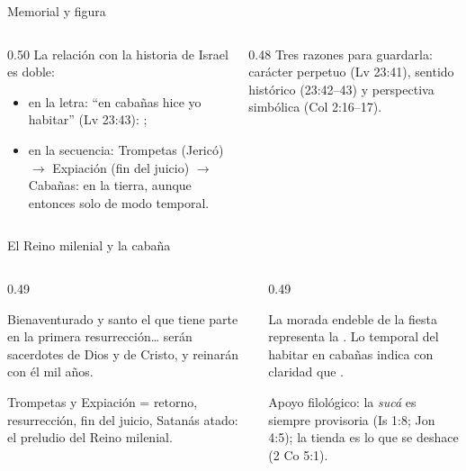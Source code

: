 \begin{frame}{Memorial y figura}
\begin{columns}[t,onlytextwidth]
\begin{column}{0.50\textwidth}\small
La relación con la historia de Israel es doble:
\begin{itemize}
\item en la letra: ``en cabañas hice yo habitar'' (Lv 23:43): ;
\item en la secuencia: Trompetas (Jericó) $\rightarrow$ Expiación (fin del juicio) $\rightarrow$ Cabañas:  en la tierra, aunque entonces solo de modo temporal.
\end{itemize}
\end{column}
\begin{column}{0.48\textwidth}\scriptsize
Tres razones para guardarla: carácter perpetuo (Lv 23:41), sentido histórico (23:42--43) y perspectiva simbólica (Col 2:16--17).\par\medskip
{}
\end{column}
\end{columns}
\end{frame}

\begin{frame}{El Reino milenial y la cabaña}
\begin{columns}[t,onlytextwidth]
\begin{column}{0.49\textwidth}
\begin{cita}Bienaventurado y santo el que tiene parte en la primera resurrección\ldots{} serán sacerdotes de Dios y de Cristo, y reinarán con él mil años.\end{cita}
\scriptsize Trompetas y Expiación = retorno, resurrección, fin del juicio, Satanás atado: el preludio del Reino milenial.
\end{column}
\begin{column}{0.49\textwidth}
\begin{tcolorbox}[colback=papiro,colframe=tierraroja,boxrule=1pt,arc=3pt,left=4pt,right=4pt]
\scriptsize La morada endeble de la fiesta representa la . Lo temporal del habitar en cabañas indica con claridad que .
\end{tcolorbox}
\scriptsize Apoyo filológico: la \emph{sucá} es siempre provisoria (Is 1:8; Jon 4:5); la tienda es lo que se deshace (2 Co 5:1).
\end{column}
\end{columns}
\end{frame}

